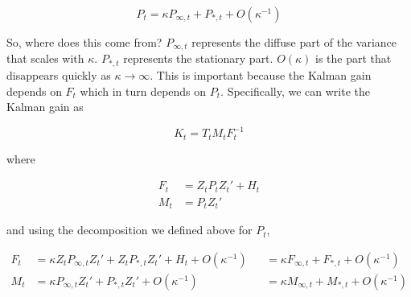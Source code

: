 \documentclass{tufte-book}
\begin{document}
\[
P_t = \kappa P_{\infty,t} + P_{*,t} + O(\kappa^{-1})
\]

So, where does this come from? $P_{\infty, t}$ represents the diffuse part of the variance that scales with $\kappa$. $P_{*,t}$ represents the stationary part. $O(\kappa)$ is the part that disappears quickly as $\kappa \rightarrow \infty$. This is important because the Kalman gain depends on $F_t$ which in turn depends on $P_t$. Specifically, we can write the Kalman gain as

\[
K_t = T_t M_t F_t^{-1}
\]

\noindent where

\begin{align*}
F_t &= Z_t P_t Z_t' + H_t \\
M_t &= P_t Z_t'
\end{align*}

\noindent and using the decomposition we defined above for $P_t$,

\begin{align*}
F_t &= \kappa Z_t P_{\infty,t} Z_t' + Z_t P_{*,t} Z_t' + H_t + O(\kappa^{-1}) &&= \kappa F_{\infty, t} + F_{*,t} + O(\kappa^{-1})\\
M_t &= \kappa P_{\infty,t} Z_t' + P_{*,t} Z_t' + O(\kappa^{-1}) &&= \kappa M_{\infty,t} + M_{*,t} + O(\kappa^{-1})
\end{align*}






\end{document}
